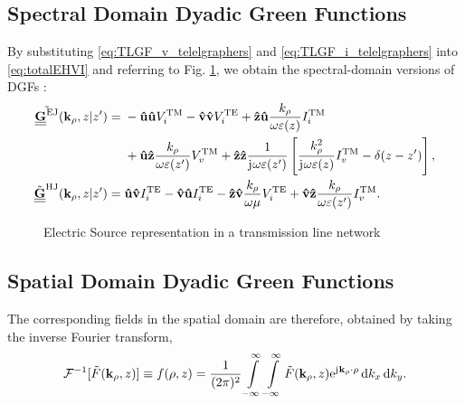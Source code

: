 \documentclass[12pt]{article}
\begin{document}
\subsection{Spectral Domain Dyadic Green Functions}
%
By substituting \eqref{eq:TLGF_v_telelgraphers} and \eqref{eq:TLGF_i_telelgraphers} into \eqref{eq:totalEHVI} and referring to Fig.
\ref{fig:J_sources}, we obtain the spectral-domain versions of DGFs \cite{michalski}:
%
\begin{subequations}
  \begin{align}
    \tilde{\underline{\underline{\mathbf{G}}}^\mathrm{EJ}}(\mathbf{k}_{\rho}, z | z') ={}& - \mathbf{\hat u} \mathbf{\hat u} V_i^{\mathrm{TM}} - \mathbf{\hat v} \mathbf{\hat v} V_i^{\mathrm{TE}}  + \mathbf{\hat z} \mathbf{\hat u}
    \frac{k_{\rho}}{\omega \varepsilon(z)} I_i^{\mathrm{TM}}  \nonumber \\
    & + \mathbf{\hat u} \mathbf{\hat z}
    \frac{k_{\rho}}{\omega \varepsilon(z')} V_v^{\mathrm{TM}} + \mathbf{\hat z} \mathbf{\hat z}
    \frac{1}{\mathrm{j}\mkern1mu \omega \varepsilon(z')} \left[\frac{k_{\rho}^2}{\mathrm{j}\mkern1mu \omega \varepsilon(z)} I_v^{\mathrm{TM}} - \delta(z - z') \right],
    \label{eq:spectralDGF_EJ}\\
    \tilde{\underline{\underline{\mathbf{G}}}}^\mathrm{HJ}(\mathbf{k}_{\rho}, z | z') ={}& \mathbf{\hat u} \mathbf{\hat v} I_i^{\mathrm{TE}} - \mathbf{\hat v} \mathbf{\hat u} I_i^{\mathrm{TE}}  - \mathbf{\hat z} \mathbf{\hat v}
    \frac{k_{\rho}}{\omega \mu} V_i^{\mathrm{TE}} + \mathbf{\hat v} \mathbf{\hat z}
    \frac{k_{\rho}}{\omega \varepsilon(z')} I_v^{\mathrm{TM}}.
    \label{eq:spectralDGF_HJ}
  \end{align}
  \label{eq:spectralDGF}%
\end{subequations}
%
\begin{figure}[h!]
  \centering
  \def\svgwidth{.75\linewidth}
  
  \caption{Electric Source representation in a transmission line network}
  \label{fig:J_sources}
\end{figure}
\subsection{Spatial Domain Dyadic Green Functions}
%



The corresponding fields in the spatial domain are therefore, obtained by taking the inverse Fourier transform,
%
\begin{equation}
  \mathcal{F}^{-1}[\tilde{F}(\mathbf{k}_{\rho},z)] \equiv f(\mathbf{\rho},z) = \frac{1}{(2 \pi )^2}\int\limits_{-\infty}^\infty \int\limits_{-\infty}^\infty
  \tilde{F}(\mathbf{k}_{\rho},z) \mathrm{e}^{\mathrm{j}\mkern1mu \mathbf{k}_{\rho} \cdot \mathbf{\rho}} \mathop{}\!\mathrm{d}{k_x} \mathop{}\!\mathrm{d}{k_y}.
  \label{eq:invFourier}
\end{equation}
%
\end{document}
